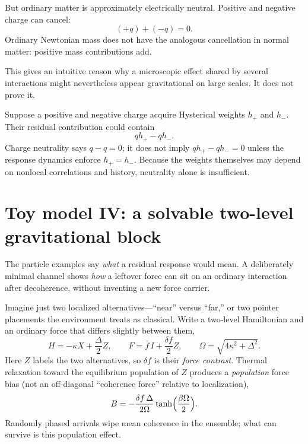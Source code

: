 \documentclass[11pt]{article}
\begin{document}
But ordinary matter is approximately electrically neutral. Positive and negative charge can cancel:
\begin{equation}
(+q)+(-q)=0.
\end{equation}
Ordinary Newtonian mass does not have the analogous cancellation in normal matter: positive mass contributions add.

This gives an intuitive reason why a microscopic effect shared by several interactions might nevertheless appear gravitational on large scales. It does not prove it.

Suppose a positive and negative charge acquire Hysterical weights $h_+$ and $h_-$. Their residual contribution could contain
\begin{equation}
q h_+-q h_-.
\end{equation}
Charge neutrality says $q-q=0$; it does not imply $qh_+-qh_-=0$ unless the response dynamics enforce $h_+=h_-$. Because the weights themselves may depend on nonlocal correlations and history, neutrality alone is insufficient.

\section{Toy model IV: a solvable two-level gravitational block}
The particle examples say \emph{what} a residual response would mean. A deliberately minimal channel shows \emph{how} a leftover force can sit on an ordinary interaction after decoherence, without inventing a new force carrier.

Imagine just two localized alternatives---``near'' versus ``far,'' or two pointer placements the environment treats as classical.
Write a two-level Hamiltonian and an ordinary force that differs slightly between them,
\begin{equation}
H=-\kappa X+\frac{\Delta}{2}Z,\qquad
F=\bar f\,I+\frac{\delta f}{2}Z,\qquad
\Omega=\sqrt{4\kappa^2+\Delta^2}.
\end{equation}
Here $Z$ labels the two alternatives, so $\delta f$ is their \emph{force contrast}.
Thermal relaxation toward the equilibrium population of $Z$ produces a \emph{population} force bias (not an off-diagonal ``coherence force'' relative to localization),
\begin{equation}
B=-\frac{\delta f\,\Delta}{2\Omega}\tanh\Bigl(\frac{\beta\Omega}{2}\Bigr).
\end{equation}
Randomly phased arrivals wipe mean coherence in the ensemble; what can survive is this population effect.
\end{document}
